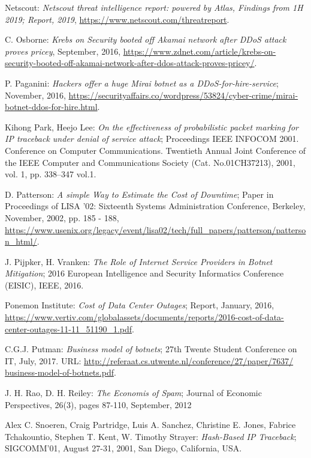 \begin{thebibliography}{99}
 Netscout: \emph{Netscout threat intelligence report: powered by Atlas, Findings from 1H 2019; Report, 2019}, \url{https://www.netscout.com/threatreport}.

 C. Osborne: \emph{Krebs on Security booted off Akamai network after DDoS attack proves pricey}, September, 2016, \url{https://www.zdnet.com/article/krebs-on-security-booted-off-akamai-network-after-ddos-attack-proves-pricey/}.

 P. Paganini: \emph{Hackers offer a huge Mirai botnet as a DDoS-for-hire-service}; November, 2016, \url{https://securityaffairs.co/wordpress/53824/cyber-crime/mirai-botnet-ddos-for-hire.html}.

 Kihong Park, Heejo Lee: \emph{On the effectiveness of probabilistic packet marking for IP traceback under denial of service attack}; Proceedings IEEE INFOCOM 2001. Conference on Computer Communications. Twentieth Annual Joint Conference of the IEEE Computer and Communications Society (Cat. No.01CH37213), 2001, vol. 1, pp. 338--347 vol.1.

 D. Patterson: \emph{A simple Way to Estimate the Cost of Downtime}; Paper in Proceedings of LISA '02: Sixteenth Systems Administration Conference, Berkeley, November, 2002, pp. 185 - 188, \url{https://www.usenix.org/legacy/event/lisa02/tech/full_papers/patterson/patterson_html/}.

 J. Pijpker, H. Vranken: \emph{The Role of Internet Service Providers in Botnet Mitigation}; 2016 European Intelligence and Security Informatics Conference (EISIC), IEEE, 2016.

 Ponemon Institute: \emph{Cost of Data Center Outages}; Report, January, 2016, \url{https://www.vertiv.com/globalassets/documents/reports/2016-cost-of-data-center-outages-11-11_51190_1.pdf}.

 C.G.J. Putman: \emph{Business model of botnets}; 27th Twente Student Conference on IT, July, 2017. URL: \url{http://referaat.cs.utwente.nl/conference/27/paper/7637/ business-model-of-botnets.pdf}.

 J. H. Rao, D. H. Reiley: \emph{The Economis of Spam}; Journal of Economic Perspectives, 26(3), pages 87-110, September, 2012

 Alex C. Snoeren, Craig Partridge, Luis A. Sanchez, Christine E. Jones, Fabrice Tchakountio, Stephen T. Kent, W. Timothy Strayer: \emph{Hash-Based IP Traceback}; SIGCOMM'01, August 27-31, 2001, San Diego, California, USA.


\end{thebibliography}
